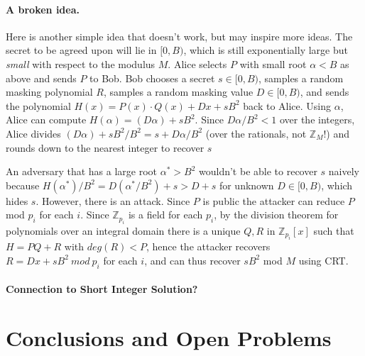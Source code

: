 \documentclass[letterpaper,twocolumn,10pt]{article}
\begin{document}
\paragraph{A broken idea.} Here is another simple idea that doesn't work, but may inspire more ideas. The secret to be agreed upon will lie in $[0, B)$, which is still exponentially large but \emph{small} with respect to the modulus $M$. Alice selects $P$ with small root $\alpha < B$ as above and sends $P$ to Bob. Bob chooses a secret $s \in [0, B)$, samples a random masking polynomial $R$, samples a random masking value $D \in [0, B)$, and sends the polynomial $H(x) = P(x) \cdot Q(x) + D x + sB^2$ back to Alice. Using $\alpha$, Alice can compute $H(\alpha) = (D \alpha) + sB^2$. Since $D\alpha/B^2 < 1$ over the integers, Alice divides $(D \alpha) + sB^2 / B^2 = s + D\alpha/B^2$ (over the rationals, not $\mathbb{Z}_M$!) and rounds down to the nearest integer to recover $s$

An adversary that has a large root $\alpha^* > B^2$ wouldn't be able to recover $s$ naively because $H(\alpha^*)/B^2 = D (\alpha^*/ B^2) + s > D + s$ for unknown $D \in [0, B)$, which hides $s$. However, there is an attack. Since $P$ is public the attacker can reduce $P$ mod $p_i$ for each $i$. Since $\mathbb{Z}_{p_i}$ is a field for each $p_i$, by the division theorem for polynomials over an integral domain there is a unique $Q, R$ in $\mathbb{Z}_{p_i}[x]$ such that $H = P Q + R$ with $deg(R) < P$, hence the attacker recovers $R = D x + sB^2 \ mod \ p_i$ for each $i$, and can thus recover $s B^2$ mod $M$ using CRT. 
 
\paragraph{Connection to Short Integer Solution?} 

\section{Conclusions and Open Problems}




{\footnotesize 
}


\end{document}
